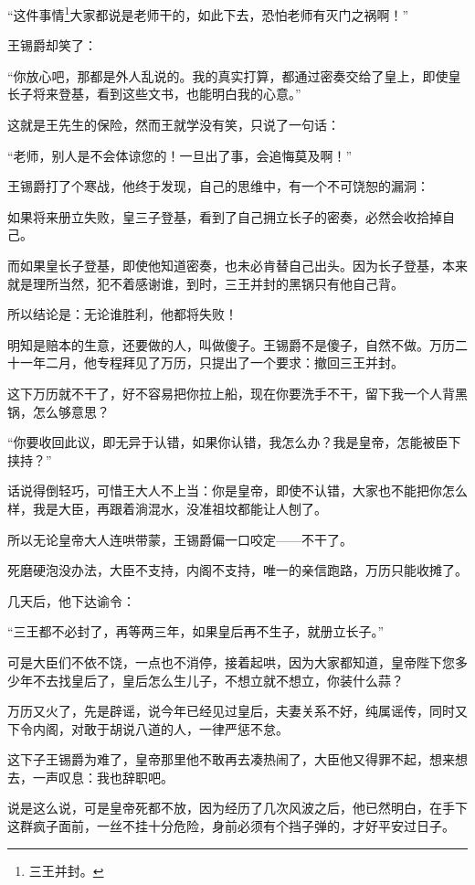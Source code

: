 \begin{multicols}{\theparacolNo}
		“这件事情\footnote{三王并封。}大家都说是老师干的，如此下去，恐怕老师有灭门之祸啊！”

		王锡爵却笑了：

		“你放心吧，那都是外人乱说的。我的真实打算，都通过密奏交给了皇上，即使皇长子将来登基，看到这些文书，也能明白我的心意。”

		这就是王先生的保险，然而王就学没有笑，只说了一句话：

		“老师，别人是不会体谅您的！一旦出了事，会追悔莫及啊！”

		王锡爵打了个寒战，他终于发现，自己的思维中，有一个不可饶恕的漏洞：

		如果将来册立失败，皇三子登基，看到了自己拥立长子的密奏，必然会收拾掉自己。

		而如果皇长子登基，即使他知道密奏，也未必肯替自己出头。因为长子登基，本来就是理所当然，犯不着感谢谁，到时，三王并封的黑锅只有他自己背。

		所以结论是：无论谁胜利，他都将失败！

		明知是赔本的生意，还要做的人，叫做傻子。王锡爵不是傻子，自然不做。万历二十一年二月，他专程拜见了万历，只提出了一个要求：撤回三王并封。

		这下万历就不干了，好不容易把你拉上船，现在你要洗手不干，留下我一个人背黑锅，怎么够意思？

		“你要收回此议，即无异于认错，如果你认错，我怎么办？我是皇帝，怎能被臣下挟持？”

		话说得倒轻巧，可惜王大人不上当：你是皇帝，即使不认错，大家也不能把你怎么样，我是大臣，再跟着淌混水，没准祖坟都能让人刨了。

		所以无论皇帝大人连哄带蒙，王锡爵偏一口咬定——不干了。

		死磨硬泡没办法，大臣不支持，内阁不支持，唯一的亲信跑路，万历只能收摊了。

		几天后，他下达谕令：

		“三王都不必封了，再等两三年，如果皇后再不生子，就册立长子。”

		可是大臣们不依不饶，一点也不消停，接着起哄，因为大家都知道，皇帝陛下您多少年不去找皇后了，皇后怎么生儿子，不想立就不想立，你装什么蒜？

		万历又火了，先是辟谣，说今年已经见过皇后，夫妻关系不好，纯属谣传，同时又下令内阁，对敢于胡说八道的人，一律严惩不怠。

		这下子王锡爵为难了，皇帝那里他不敢再去凑热闹了，大臣他又得罪不起，想来想去，一声叹息：我也辞职吧。

		说是这么说，可是皇帝死都不放，因为经历了几次风波之后，他已然明白，在手下这群疯子面前，一丝不挂十分危险，身前必须有个挡子弹的，才好平安过日子。


\end{multicols}

